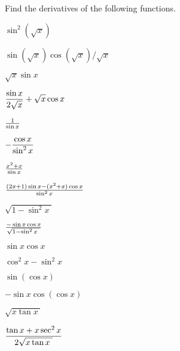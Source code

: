 \begin{exercises}
Find the derivatives of the following functions.

\twocol

\begin{exercise} $\sin^2(\sqrt{x})$
\begin{answer} $\sin(\sqrt{x})\cos(\sqrt{x})/\sqrt{x}$
\end{answer}\end{exercise}

\begin{exercise} $\sqrt{x}\sin x$
\begin{answer} $\displaystyle{\sin x\over2\sqrt x}+\sqrt{x}\cos x$
\end{answer}\end{exercise}

\begin{exercise} ${1\over \sin x}$
\begin{answer} $ \displaystyle-{\cos x\over \sin^2 x}$
\end{answer}\end{exercise}

\begin{exercise} ${x^2+x\over \sin x}$
\begin{answer} ${(2x +1)\sin x - (x^2+x)\cos x\over \sin^2 x}$
\end{answer}\end{exercise}

\begin{exercise} $\sqrt{1-\sin^2x\ }$
\begin{answer} ${-\sin x\cos x\over \sqrt{1-\sin^2x\ }}$
\end{answer}\end{exercise}

\begin{exercise} $\sin x\cos x$
\begin{answer} $\cos^2 x-\sin^2 x$
\end{answer}\end{exercise}

\begin{exercise} $\sin(\cos x)$
\begin{answer} $-\sin x\cos(\cos x)$
\end{answer}\end{exercise}

\begin{exercise} $\sqrt{x\tan x\ }$
\begin{answer} $\ds{\tan x+x\sec^2 x\over2\sqrt{x\tan x\ }}$
\end{answer}\end{exercise}


\end{exercises}
